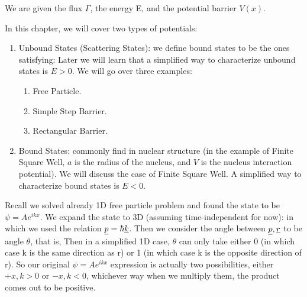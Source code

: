 \documentclass{school-22.101-notes}
\date{September 19, 2011}
\begin{document}
\maketitle

We are given the flux $\Gamma$, the energy E, and the potential barrier $V(x)$. 

In this chapter, we will cover two types of potentials:
\begin{enumerate}
\item Unbound States (Scattering States): we define bound states to be the ones satisfying:
Later we will learn that a simplified way to characterize unbound states is $E > 0$. We will go over three examples:
\begin{enumerate}
\item Free Particle.
\item Simple Step Barrier.
\item Rectangular Barrier.
\end{enumerate}

\item Bound States: commonly find in nuclear structure (in the example of Finite Square Well, $a$ is the radius of the nucleus, and $V$ is the nucleus interaction potential). We will discuss the case of Finite Square Well. A simplified way to characterize bound states is $E<0$. 
\end{enumerate}


Recall we solved already 1D free particle problem and found the state to be $\psi = A e^{ikx}$. We expand the state to 3D (assuming time-independent for now):
in which we used the relation $\underline{p} = \hbar \underline{k}$. Then we consider the angle between $\underline{p}, \underline{r}$ to be angle $\theta$, that is, 
Then in a simplified 1D case, $\theta$ can only take either 0 (in which case k is the same direction as r) or 1 (in which case k is the opposite direction of r). So our original $\psi = A e^{ikx}$ expression is actually two possibilities, either $+x, k>0$ or $-x, k<0$, whichever way when we multiply them, the product comes out to be positive. 
\end{document}
